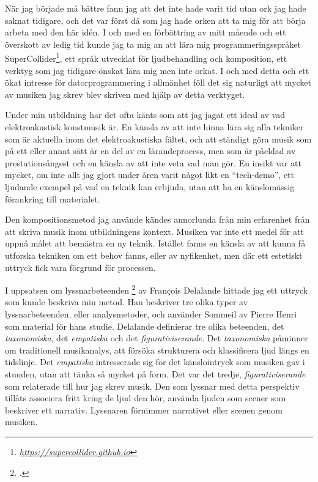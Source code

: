 \documentclass{article}
\begin{document}
När jag började må bättre fann jag att det inte hade varit tid utan ork jag hade saknat tidigare, och det var
först då som jag hade orken att ta mig för att börja arbeta med den här idén. I och med en förbättring av
mitt mående och ett överskott av ledig tid kunde jag ta mig an att lära mig programmeringsspråket 
SuperCollider\footnote{\emph{\url{https://supercollider.github.io}}}, ett språk utvecklat för ljudbehandling och
komposition, ett verktyg som jag tidigare önskat lära mig men inte orkat. I och med detta och ett ökat
intresse för datorprogrammering i allmänhet föll det sig naturligt att mycket av musiken jag skrev blev
skriven med hjälp av detta verktyget.

Under min utbildning har det ofta känts som att jag jagat ett ideal av vad elektroakustisk konstmusik är. En
känsla av att inte hinna lära sig alla tekniker som är aktuella inom det elektroakustiska fältet, och att
ständigt göra musik som på ett eller annat sätt är en del av en lärandeprocess, men som är påeldad av
prestationsångest och en känsla av att inte veta vad man gör. En insikt var att mycket, om inte allt jag gjort
under åren varit något likt en ``tech-demo'', ett ljudande exempel på vad en teknik kan erbjuda, utan att ha en
känslomässig förankring till materialet.

Den kompositionsmetod jag använde kändes annorlunda från min erfarenhet från att skriva musik inom
utbildningens kontext. Musiken var inte ett medel för att uppnå målet att bemästra en ny teknik. Istället
fanns en känsla av att kunna få utforska tekniken om ett behov fanns, eller av nyfikenhet, men där ett
estetiskt uttryck fick vara förgrund för processen. 

I uppsatsen om lyssnarbeteenden \footcite{Delalande1998} av François Delalande hittade jag ett uttryck som kunde beskriva min metod. Han
beskriver tre olika typer av lyssnarbeteenden, eller analysmetoder, och använder Sommeil av Pierre Henri som
material för hans studie. Delalande definierar tre olika beteenden, det \emph{taxonomiska}, det
\emph{empatiska} och det \emph{figurativiserande}. Det \emph{taxonomiska} påminner om traditionell
musikanalys, att försöka strukturera och klassificera ljud längs en tidslinje. Det \emph{empatiska}
intresserade sig för det känslointryck som musiken gav i stunden, utan att tänka så mycket på form. Det var
det tredje, \emph{figurativiserande} som relaterade till hur jag skrev musik. Den som lyssnar med detta
perspektiv tillåts associera fritt kring de ljud den hör, använda ljuden som scener som beskriver ett
narrativ. Lyssnaren förnimmer narrativet eller scenen genom musiken. 
\end{document}
